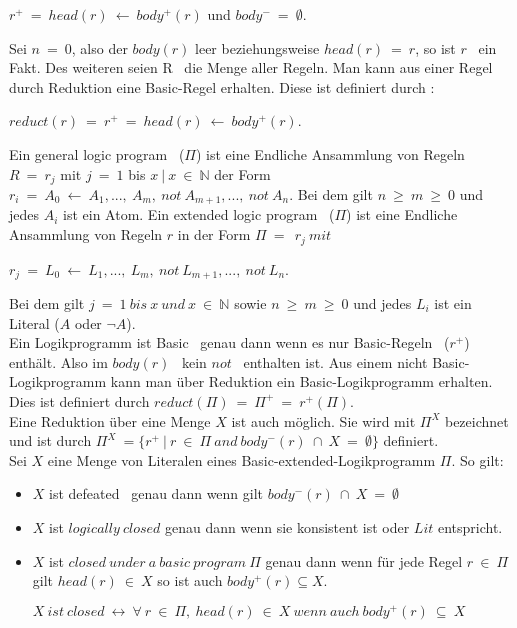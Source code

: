 \begin{center}
	$r^+~=~head(r)~\leftarrow~body^+(r)$ und $body^-~=~\emptyset$. \\
\end{center}	

Sei $n~=~0$, also der $body(r)$ leer beziehungsweise $head(r)~=~r$,
so ist \glqq $r$\grqq~ ein Fakt. Des weiteren seien \glqq R\grqq~ die Menge
aller Regeln. Man kann aus einer Regel durch Reduktion eine Basic-Regel
erhalten. Diese ist definiert durch :
\begin{center}
  $reduct(r)~=~r^+~=~head(r)~\leftarrow~body^+(r)$.\\
\end{center}

Ein \glqq general logic program\grqq~ ($\Pi$)  ist eine Endliche Ansammlung von
Regeln $R~=~r_j$ mit $j~=~1$ bis $x~|~x~\in~\mathbb{N}$ der Form\\
$r_i~=~A_0~\leftarrow~A_1,...,~A_m,~not~A_{m+1},...,~not~A_n$. Bei dem gilt
$n~\geq~m~\geq~0$ und jedes $A_i$ ist ein Atom.
Ein \glqq extended logic program\grqq~ ($\Pi$) ist eine Endliche Ansammlung
von Regeln $r$ in der Form $\Pi~=~~r_j~mit$

\begin{center}
	$r_j~=~L_0~\leftarrow~L_1,...,~L_m,~not~L_{m+1},...,~not~L_n$. \\
\end{center}

Bei dem gilt $j~=~1~bis~x~und~x~\in~\mathbb{N}$ sowie $n~\geq~m~\geq~0$ und
jedes $L_i$ ist ein Literal ($A$ oder $\neg A$).\\

Ein Logikprogramm ist \glqq Basic\grqq~ genau dann wenn es nur
\glqq Basic-Regeln\grqq~ ($r^+$) enthält. Also im \glqq $body(r)$\grqq~
kein \glqq $not$\grqq~ enthalten ist. Aus einem nicht Basic-Logikprogramm kann
man über Reduktion ein Basic-Logikprogramm erhalten. Dies ist definiert durch
$reduct(\Pi)~=~\Pi^+~=~r^+(\Pi)$. \\
  
Eine Reduktion über eine Menge $X$ ist auch möglich.
Sie wird mit $\Pi^X$ bezeichnet und ist durch
$\Pi^X~=\{r^+~|~r~\in~\Pi~and~body^-(r)~\cap~X~=~\emptyset \}$ definiert. \\

Sei $X$ eine Menge von Literalen eines Basic-extended-Logikprogramm $\Pi$.
So gilt:

\begin{itemize}
	\item $X$ ist \glqq defeated\grqq~ genau dann wenn gilt
    $body^-(r)~\cap~X~=~\emptyset$
	\item $X$ ist $logically~closed$ genau dann wenn sie konsistent ist oder
    $Lit$ entspricht.	
	\item $X$ ist $closed~under~a~basic~program~\Pi$ genau dann wenn für jede Regel
    $r~\in~\Pi$	gilt $head(r)~\in~X$ so ist auch $body^+(r) \subseteq X$.
	 	 \begin{center}
	     $X~ist~closed~\leftrightarrow~\forall~r~\in~\Pi,~head(r)~\in~X~wenn~auch~body^+(r)~\subseteq~X$ \\
     \end{center}
\end{itemize}

